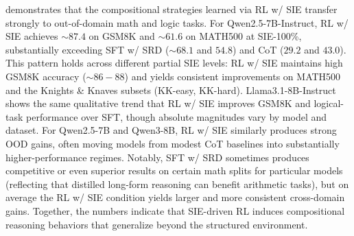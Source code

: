 \documentclass{article} %
\begin{document}
 demonstrates that the compositional strategies learned via RL w/ SIE transfer strongly to out-of-domain math and logic tasks. For Qwen2.5-7B-Instruct, RL w/ SIE achieves $\sim 87.4$ on GSM8K and $\sim 61.6$ on MATH500 at SIE-100\%, substantially exceeding SFT w/ SRD ($\sim 68.1$ and $54.8$) and CoT ($29.2$ and $43.0$). This pattern holds across different partial SIE levels: RL w/ SIE maintains high GSM8K accuracy ($\sim 86-88$) and yields consistent improvements on MATH500 and the Knights \& Knaves subsets (KK-easy, KK-hard). Llama3.1-8B-Instruct shows the same qualitative trend that RL w/ SIE improves GSM8K and logical-task performance over SFT, though absolute magnitudes vary by model and dataset. For Qwen2.5-7B and Qwen3-8B, RL w/ SIE similarly produces strong OOD gains, often moving models from modest CoT baselines into substantially higher-performance regimes. Notably, SFT w/ SRD sometimes produces competitive or even superior results on certain math splits for particular models (reflecting that distilled long-form reasoning can benefit arithmetic tasks), but on average the RL w/ SIE condition yields larger and more consistent cross-domain gains. Together, the numbers indicate that SIE-driven RL induces compositional reasoning behaviors that generalize beyond the structured environment.
\end{document}
